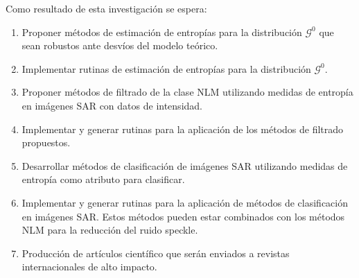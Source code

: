 \documentclass[11pt]{article}
\begin{document}
Como resultado de esta investigación se espera:
\begin{enumerate}
	\item Proponer métodos de estimación de entropías para la distribución $\mathcal{G}^0$ que sean robustos ante desvíos del modelo teórico.
	\item Implementar rutinas de estimación de entropías para la distribución $\mathcal{G}^0$.
	\item Proponer métodos de filtrado de la clase NLM utilizando medidas de entropía en imágenes SAR con datos de intensidad.
	\item Implementar y generar rutinas para la aplicación de los métodos de filtrado propuestos.
	\item Desarrollar métodos de clasificación de imágenes SAR utilizando medidas de entropía como atributo para clasificar.
	\item Implementar y generar rutinas para la aplicación de métodos de clasificación en imágenes SAR. Estos métodos pueden estar combinados con los métodos NLM para la reducción del ruido speckle.
	\item Producción de artículos científico que serán enviados a revistas internacionales de alto impacto. 
\end{enumerate}

%


\end{document}
